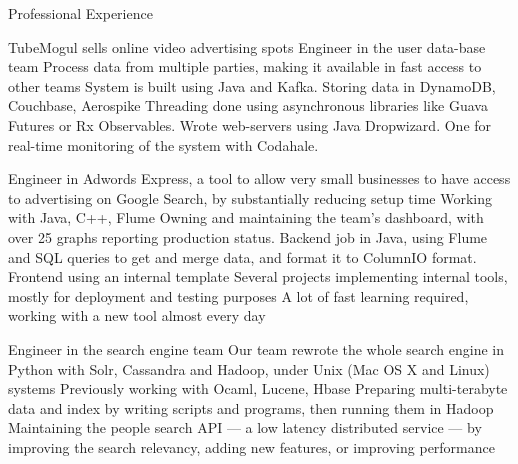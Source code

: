 \begin{rubric}{\color{ForestGreen} Professional Experience}


   TubeMogul sells online video advertising spots
  Engineer in the user data-base team
  Process data from multiple parties, making it
available in fast access to other teams
  System is built using Java and Kafka. Storing data in DynamoDB, Couchbase,
 Aerospike
 \entry* Threading done using asynchronous libraries like Guava Futures or Rx Observables.
 \entry* Wrote web-servers using Java Dropwizard. One for real-time monitoring of the system with Codahale.

  \entry*[\multicolumn{1}{@{}>{\mykeyfont}p{2.5cm}}{%
\color{ForestGreen} {Feb 13 - Sep 14} \newline
\color{NavyBlue} G\color{Red} o\color{YellowOrange} o\color{NavyBlue} g\color{ForestGreen} l\color{Red} e}]
  Engineer in {Adwords Express}, a tool to allow very small businesses to have access to
 advertising on Google Search, by substantially reducing setup time
   Working with Java, C++, Flume
  Owning and maintaining the team's dashboard, with over 25 graphs reporting production status. Backend job in Java,
using Flume and SQL queries to get and merge data, and format it to ColumnIO format. Frontend using an internal template
  \entry* Several projects implementing internal tools, mostly for deployment and testing purposes
\entry* A lot of fast learning required, working with a new tool almost every day


  Engineer in the {search engine team}
 Our team rewrote the whole search engine in Python with Solr, Cassandra
 and Hadoop, under Unix (Mac OS X and Linux) systems
 Previously working with Ocaml, Lucene, Hbase
  \entry*
  Preparing multi-terabyte data and index by writing scripts and programs,
  then running them in Hadoop
  \entry*
  Maintaining the people search API --- a low latency distributed
  service --- by improving the search relevancy, adding new features,
  or improving performance



\end{rubric}
